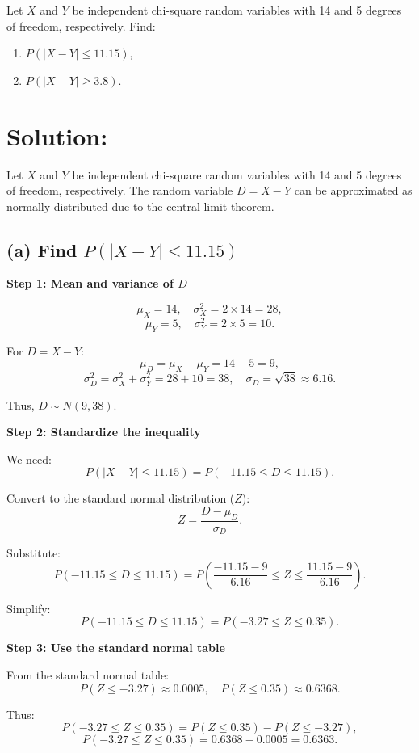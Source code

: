\documentclass{article}
\begin{document}
Let $X$ and $Y$ be independent chi-square random variables with 14 and 5 degrees of freedom, respectively. Find:
\begin{enumerate}
    \item[(a)] $P(|X - Y| \leq 11.15)$,
    \item[(b)] $P(|X - Y| \geq 3.8)$.
\end{enumerate}

\section*{Solution:}


Let $X$ and $Y$ be independent chi-square random variables with 14 and 5 degrees of freedom, respectively. The random variable $D = X - Y$ can be approximated as normally distributed due to the central limit theorem.

\subsection*{(a) Find $P(|X - Y| \leq 11.15)$}

\textbf{Step 1: Mean and variance of $D$}

\[
\mu_X = 14, \quad \sigma_X^2 = 2 \times 14 = 28,
\]
\[
\mu_Y = 5, \quad \sigma_Y^2 = 2 \times 5 = 10.
\]

For $D = X - Y$:
\[
\mu_D = \mu_X - \mu_Y = 14 - 5 = 9,
\]
\[
\sigma_D^2 = \sigma_X^2 + \sigma_Y^2 = 28 + 10 = 38, \quad \sigma_D = \sqrt{38} \approx 6.16.
\]

Thus, $D \sim N(9, 38)$.

\textbf{Step 2: Standardize the inequality}

We need:
\[
P(|X - Y| \leq 11.15) = P(-11.15 \leq D \leq 11.15).
\]

Convert to the standard normal distribution ($Z$):
\[
Z = \frac{D - \mu_D}{\sigma_D}.
\]

Substitute:
\[
P(-11.15 \leq D \leq 11.15) = P\left(\frac{-11.15 - 9}{6.16} \leq Z \leq \frac{11.15 - 9}{6.16}\right).
\]

Simplify:
\[
P(-11.15 \leq D \leq 11.15) = P(-3.27 \leq Z \leq 0.35).
\]

\textbf{Step 3: Use the standard normal table}

From the standard normal table:
\[
P(Z \leq -3.27) \approx 0.0005, \quad P(Z \leq 0.35) \approx 0.6368.
\]

Thus:
\[
P(-3.27 \leq Z \leq 0.35) = P(Z \leq 0.35) - P(Z \leq -3.27),
\]
\[
P(-3.27 \leq Z \leq 0.35) = 0.6368 - 0.0005 = 0.6363.
\]
\end{document}
